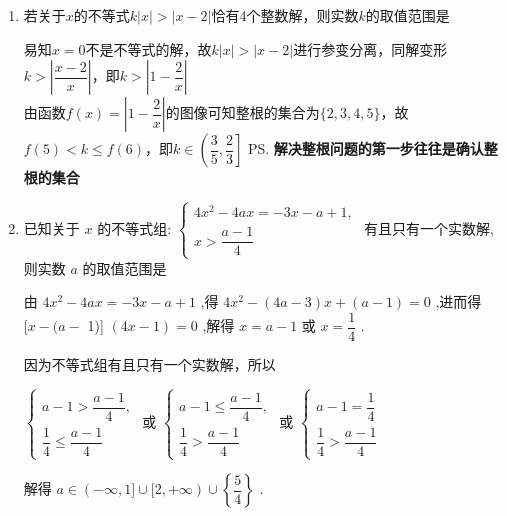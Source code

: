 \begin{enumerate}
\begin{jieda}
\begin{dingautolist}{172}
            \item $a > 1$，第一个不等式解集为$(1 - a, a)$，故不等式解集为$(1 - a, a)$，当$a \in (1, 2]$满足要求.
        \end{dingautolist}
    \end{jieda}
    \item 若关于$x$的不等式$k|x| > |x - 2|$恰有4个整数解，则实数$k$的取值范围是\blkda[4]{$\left(\dfrac{3}{5}, \dfrac{2}{3}\right]$}
        \begin{jieda}
            易知$x = 0$不是不等式的解，故$k|x| > |x - 2|$进行参变分离，同解变形$k > \left|\dfrac{x-2}{x}\right|$，即$k > \left|1 - \dfrac{2}{x}\right|$ \\
            由函数$f(x) = \left|1 - \dfrac{2}{x}\right|$的图像可知整根的集合为$\{2, 3, 4, 5\}$，故$f(5) < k \leq f(6)$，即$k \in \left(\dfrac{3}{5}, \dfrac{2}{3}\right]$
            \ps \textbf{解决整根问题的第一步往往是确认整根的集合}
        \end{jieda}
    
    \item 已知关于 $x$ 的不等式组: $\left\{  \begin{array}{l} 4{x}^{2} - {4ax} =  - {3x} - a + 1, \\  x > \dfrac{a - 1}{4} \end{array}\right.$ 有且只有一个实数解,则实数 $a$ 的取值范围是
    \begin{jieda}
        由 $4{x}^{2} - {4ax} =  - {3x} - a + 1$ ,得 $4{x}^{2} - \left( {{4a} - 3}\right) x + \left( {a - 1}\right)  = 0$ ,进而得 $\lbrack x - (a -$ 1)] $\left( {{4x} - 1}\right)  = 0$ ,解得 $x = a - 1$ 或 $x = \dfrac{1}{4}$ .
        
        因为不等式组有且只有一个实数解，所以 
        
        $\left\{  \begin{array}{l} a - 1 > \dfrac{a - 1}{4}, \\  \dfrac{1}{4} \leq  \dfrac{a - 1}{4} \end{array}\right.$ 或 $\left\{  \begin{array}{l} a - 1 \leq  \dfrac{a - 1}{4}, \\  \dfrac{1}{4} > \dfrac{a - 1}{4} \end{array}\right.$ 或 $\left\{  \begin{array}{l} a - 1 = \dfrac{1}{4} \\  \dfrac{1}{4} > \dfrac{a - 1}{4}\end{array}\right.$
        
        解得 $a \in ( - \infty ,1\rbrack  \cup   \lbrack 2, + \infty ) \cup  \left\{  \dfrac{5}{4}\right\}$ .
    \end{jieda}
\end{enumerate}
